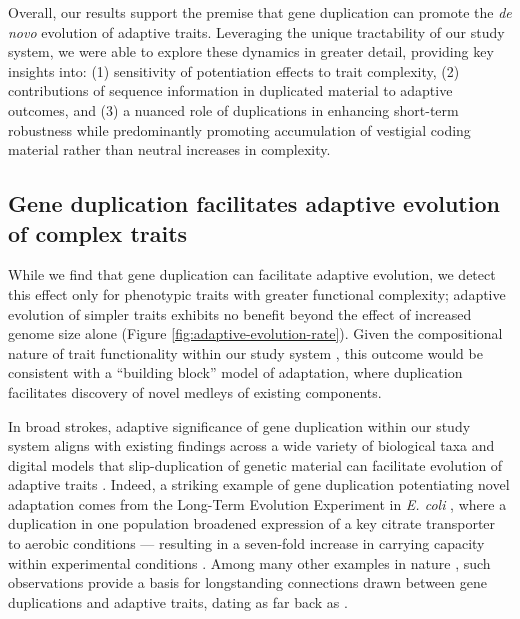Overall, our results support the premise that gene duplication can promote the \textit{de novo} evolution of adaptive traits.
Leveraging the unique tractability of our study system, we were able to explore these dynamics in greater detail, providing key insights into:
(1) sensitivity of potentiation effects to trait complexity,
(2) contributions of sequence information in duplicated material to adaptive outcomes, and
(3) a nuanced role of duplications in enhancing short-term robustness while predominantly promoting accumulation of vestigial coding material rather than neutral increases in complexity.

\subsection{Gene duplication facilitates adaptive evolution of complex traits}

While we find that gene duplication can facilitate adaptive evolution, we detect this effect only for phenotypic traits with greater functional complexity; adaptive evolution of simpler traits exhibits no benefit beyond the effect of increased genome size alone (Figure \ref{fig:adaptive-evolution-rate}).
Given the compositional nature of trait functionality within our study system \citep{Lenski2003Evolutionary}, this outcome would be consistent with a ``building block'' model of adaptation, where duplication facilitates discovery of novel medleys of existing components.

In broad strokes, adaptive significance of gene duplication within our study system aligns with existing findings across a wide variety of biological taxa and digital models that slip-duplication of genetic material can facilitate evolution of adaptive traits \citep{Koza:1995fr,Zhang:2003fw,Teichmann:2004cz}.
Indeed, a striking example of gene duplication potentiating novel adaptation comes from the Long-Term Evolution Experiment in \textit{E. coli} \citep{lenski1991longterm,Lenski2003phenotypic}, where a duplication in one population broadened expression of a key citrate transporter to aerobic conditions --- resulting in a seven-fold increase in carrying capacity within experimental conditions \citep{blount_genomic_2012}.
Among many other examples in nature \citep{zhang2002adaptive,gaines2009gene,perry2007diet,hittinger2007gene,benderoth2006positive,dulai1999evolution,Ogino2015}, such observations provide a basis for longstanding connections drawn between gene duplications and adaptive traits, dating as far back as \citet{ohno1970evolution}.

